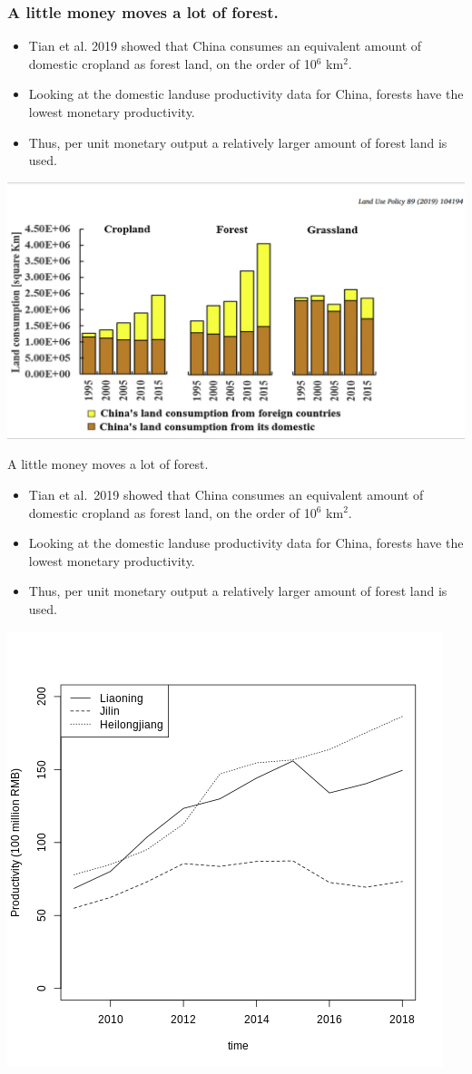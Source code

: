 \documentclass[aspectratio=169]{beamer}
\begin{document}
\begin{frame}
  \frametitle{A little money moves a lot of forest. }

  \begin{itemize}
  \item Tian et al. 2019 showed that China consumes an equivalent amount
    of domestic cropland as forest land, on the order of 10$^6$ km$^2$.
  \item Looking at the domestic landuse productivity data for China,
    forests have the lowest monetary productivity.
  \item Thus, per unit monetary output a relatively larger amount of
    forest land is used.
  \end{itemize}

\begin{center}\includegraphics[width=0.5\linewidth]{images/Tian_2019_Fig1} \end{center}

\end{frame}

\begin{frame}{A little money moves a lot of forest.}

\begin{itemize}
\item
  Tian et al.~2019 showed that China consumes an equivalent amount of
  domestic cropland as forest land, on the order of 10\(^6\) km\(^2\).
\item
  Looking at the domestic landuse productivity data for China, forests
  have the lowest monetary productivity.
\item
  Thus, per unit monetary output a relatively larger amount of forest
  land is used.
\end{itemize}

\begin{center}\includegraphics[width=0.5\linewidth]{images/prod_for_time_nec} \end{center}

\end{frame}
\end{document}
